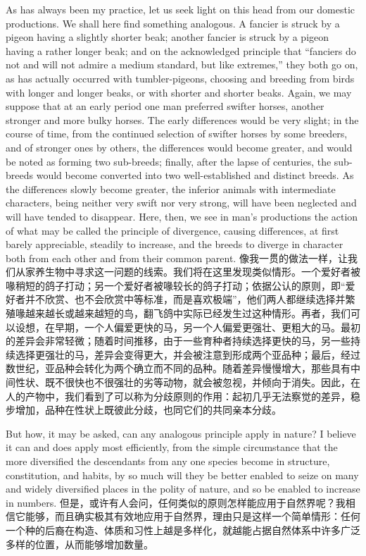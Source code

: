 \darwinpair
{As has always been my practice, let us seek light on this head from our domestic productions. We shall here find something analogous. A fancier is struck by a pigeon having a slightly shorter beak; another fancier is struck by a pigeon having a rather longer beak; and on the acknowledged principle that “fanciers do not and will not admire a medium standard, but like extremes,” they both go on, as has actually occurred with tumbler-pigeons, choosing and breeding from birds with longer and longer beaks, or with shorter and shorter beaks. Again, we may suppose that at an early period one man preferred swifter horses, another stronger and more bulky horses. The early differences would be very slight; in the course of time, from the continued selection of swifter horses by some breeders, and of stronger ones by others, the differences would become greater, and would be noted as forming two sub-breeds; finally, after the lapse of centuries, the sub-breeds would become converted into two well-established and distinct breeds. As the differences slowly become greater, the inferior animals with intermediate characters, being neither very swift nor very strong, will have been neglected and will have tended to disappear. Here, then, we see in man's productions the action of what may be called the principle of divergence, causing differences, at first barely appreciable, steadily to increase, and the breeds to diverge in character both from each other and from their common parent.}
{像我一贯的做法一样，让我们从家养生物中寻求这一问题的线索。我们将在这里发现类似情形。一个爱好者被喙稍短的鸽子打动；另一个爱好者被喙较长的鸽子打动；依据公认的原则，即“爱好者并不欣赏、也不会欣赏中等标准，而是喜欢极端”，他们两人都继续选择并繁殖喙越来越长或越来越短的鸟，翻飞鸽中实际已经发生过这种情形。再者，我们可以设想，在早期，一个人偏爱更快的马，另一个人偏爱更强壮、更粗大的马。最初的差异会非常轻微；随着时间推移，由于一些育种者持续选择更快的马，另一些持续选择更强壮的马，差异会变得更大，并会被注意到形成两个亚品种；最后，经过数世纪，亚品种会转化为两个确立而不同的品种。随着差异慢慢增大，那些具有中间性状、既不很快也不很强壮的劣等动物，就会被忽视，并倾向于消失。因此，在人的产物中，我们看到了可以称为分歧原则的作用：起初几乎无法察觉的差异，稳步增加，品种在性状上既彼此分歧，也同它们的共同亲本分歧。}

\darwinpair
{But how, it may be asked, can any analogous principle apply in nature? I believe it can and does apply most efficiently, from the simple circumstance that the more diversified the descendants from any one species become in structure, constitution, and habits, by so much will they be better enabled to seize on many and widely diversified places in the polity of nature, and so be enabled to increase in numbers.}
{但是，或许有人会问，任何类似的原则怎样能应用于自然界呢？我相信它能够，而且确实极其有效地应用于自然界，理由只是这样一个简单情形：任何一个种的后裔在构造、体质和习性上越是多样化，就越能占据自然体系中许多广泛多样的位置，从而能够增加数量。}

